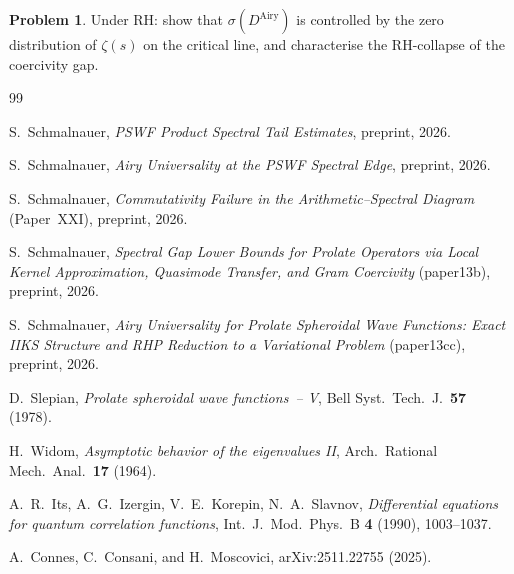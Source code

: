 \documentclass[12pt,a4paper]{amsart}
\theoremstyle{definition}
\newtheorem{problem}{Problem}[section]
\begin{document}
\begin{problem}\label{prob:rh_collapses}
Under RH: show that $\sigma(D^{\mathrm{Airy}})$ is controlled
by the zero distribution of $\zeta(s)$ on the critical line,
and characterise the RH-collapse of the coercivity gap.
\end{problem}

\begin{thebibliography}{99}

S.~Schmalnauer,
\textit{PSWF Product Spectral Tail Estimates},
preprint, 2026.

S.~Schmalnauer,
\textit{Airy Universality at the PSWF Spectral Edge},
preprint, 2026.

S.~Schmalnauer,
\textit{Commutativity Failure in the Arithmetic--Spectral Diagram}
(Paper~XXI), preprint, 2026.

S.~Schmalnauer,
\textit{Spectral Gap Lower Bounds for Prolate Operators
via Local Kernel Approximation, Quasimode Transfer,
and Gram Coercivity}
(paper13b), preprint, 2026.

S.~Schmalnauer,
\textit{Airy Universality for Prolate Spheroidal Wave Functions:
Exact IIKS Structure and RHP Reduction to a Variational Problem}
(paper13cc), preprint, 2026.

D.~Slepian,
\textit{Prolate spheroidal wave functions~-- V},
Bell Syst.\ Tech.\ J.\ \textbf{57} (1978).

H.~Widom,
\textit{Asymptotic behavior of the eigenvalues II},
Arch.\ Rational Mech.\ Anal.\ \textbf{17} (1964).

A.~R.~Its, A.~G.~Izergin, V.~E.~Korepin, N.~A.~Slavnov,
\textit{Differential equations for quantum correlation functions},
Int.\ J.\ Mod.\ Phys.\ B \textbf{4} (1990), 1003--1037.

A.~Connes, C.~Consani, and H.~Moscovici,
arXiv:2511.22755 (2025).

\end{thebibliography}
\end{document}
